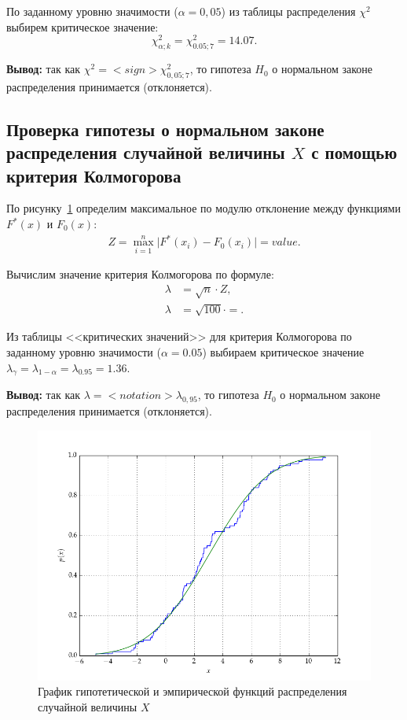 \documentclass[14pt,hidelinks]{extarticle}
\begin{document}
По заданному уровню значимости ($\alpha = 0,05$) из таблицы распределения $\chi^2$ выбирем критическое значение:
\begin{equation*}
  \chi^2_{\alpha; k} = \chi^2_{0.05; 7} = 14.07.
\end{equation*}

\textbf{Вывод:} так как $\chi^2 =  {<}sign{>} \chi^2_{0,05;7} $, то гипотеза $H_0$ о нормальном законе распределения принимается (отклоняется). 


\subsection{Проверка гипотезы о нормальном законе распределения 
  случайной величины $ X $ с помощью критерия Колмогорова}

По рисунку~\ref{fig:sample_normal} определим максимальное по модулю отклонение между функциями $F^*(x)$ и $F_0(x)$:
\begin{align}
	Z = \max_{i=1}^n \Big| F^*(x_i) - F_0(x_i) \Big| = value.
\end{align}

Вычислим значение критерия Колмогорова по формуле:
\begin{align}
  \lambda &= \sqrt{n} \cdot Z, \\ \nonumber
  \lambda &= \sqrt{100} \cdot  = .
\end{align}

Из таблицы <<критических значений>> для критерия Колмогорова по заданному уровню значимости ($\alpha = 0.05$)
выбираем критическое значение $\lambda_{\gamma} = \lambda_{1-\alpha} = \lambda_{0.95} = 1.36 $.

\textbf{Вывод:} так как $\lambda =  {<}notation{>} \lambda_{0,95} $, то гипотеза $H_0$ о нормальном законе распределения принимается (отклоняется).

\newpage
\fancyhf{}
\begin{landscape}
  \begin{figure}[H]
    \centering
    \includegraphics[width=0.9\linewidth]{pic/sample_normal.png}
    \caption{График гипотетической и эмпирической функций распределения случайной величины $ X $\label{fig:sample_normal}}
  \end{figure}
\end{landscape}
\restoregeometry
\end{document}
